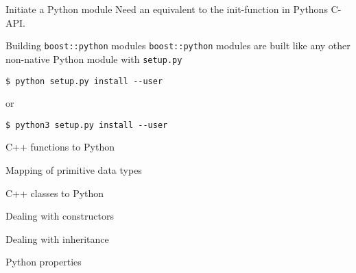 
\begin{frame}[fragile]{Initiate a Python module}
Need an equivalent to the init-function in Pythons C-API.

\end{frame}

\begin{frame}[fragile]{Building \texttt{boost::python} modules}
    \texttt{boost::python} modules are built like any other non-native 
    Python module with \texttt{setup.py}

    \begin{verbatim}
$ python setup.py install --user
    \end{verbatim}
    or 
    \begin{verbatim}
$ python3 setup.py install --user
    \end{verbatim}
\end{frame}

\begin{frame}[fragile]{C++ functions to Python}
\end{frame}

\begin{frame}[fragile]{Mapping of primitive data types}
    
\end{frame}

\begin{frame}[fragile]{C++ classes to Python}
\end{frame}

\begin{frame}[fragile]{Dealing with constructors}
\end{frame}

\begin{frame}[fragile]{Dealing with inheritance}
\end{frame}

\begin{frame}[fragile]{Python properties}
\end{frame}




